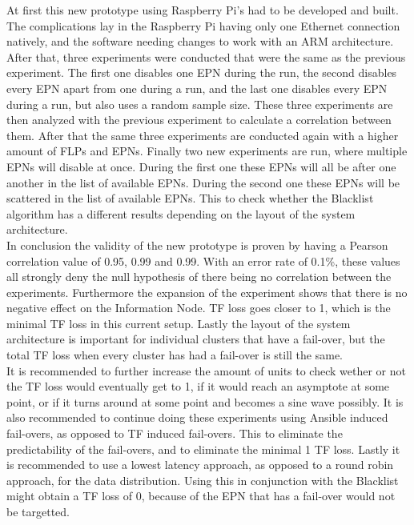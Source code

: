 At first this new prototype using Raspberry Pi's had to be developed and built. The complications lay in the Raspberry Pi having only one Ethernet connection natively, and the software needing changes to work with an ARM architecture. After that, three experiments were conducted that were the same as the previous experiment. The first one disables one EPN during the run, the second disables every EPN apart from one during a run, and the last one disables every EPN during a run, but also uses a random sample size. These three experiments are then analyzed with the previous experiment to calculate a correlation between them. After that the same three experiments are conducted again with a higher amount of FLPs and EPNs. Finally two new experiments are run, where multiple EPNs will disable at once. During the first one these EPNs will all be after one another in the list of available EPNs. During the second one these EPNs will be scattered in the list of available EPNs. This to check whether the Blacklist algorithm has a different results depending on the layout of the system architecture. \\
In conclusion the validity of the new prototype is proven by having a Pearson correlation value of 0.95, 0.99 and 0.99. With an error rate of 0.1\%, these values all strongly deny the null hypothesis of there being no correlation between the experiments. Furthermore the expansion of the experiment shows that there is no negative effect on the Information Node. TF loss goes closer to 1, which is the minimal TF loss in this current setup. Lastly the layout of the system architecture is important for individual clusters that have a fail-over, but the total TF loss when every cluster has had a fail-over is still the same. \\
It is recommended to further increase the amount of units to check wether or not the TF loss would eventually get to 1, if it would reach an asymptote at some point, or if it turns around at some point and becomes a sine wave possibly. It is also recommended to continue doing these experiments using Ansible induced fail-overs, as opposed to TF induced fail-overs. This to eliminate the predictability of the fail-overs, and to eliminate the minimal 1 TF loss. Lastly it is recommended to use a lowest latency approach, as opposed to a round robin approach, for the data distribution. Using this in conjunction with the Blacklist might obtain a TF loss of 0, because of the EPN that has a fail-over would not be targetted.